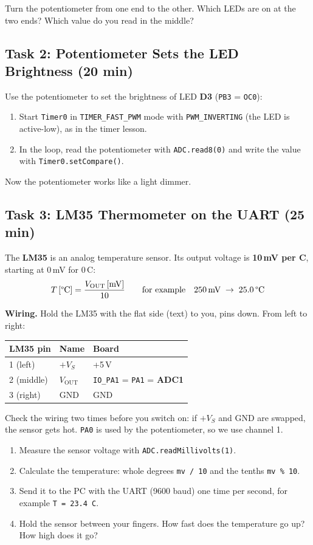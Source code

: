 \documentclass[11pt,a4paper]{article}
\newcommand{\code}[1]{\texttt{#1}}
\begin{document}
Turn the potentiometer from one end to the other. Which LEDs are on at the
two ends? Which value do you read in the middle?

\subsection*{Task 2: Potentiometer Sets the LED Brightness (20 min)}
Use the potentiometer to set the brightness of LED \textbf{D3}
(\code{PB3} = \code{OC0}):
\begin{enumerate}
  \item Start \code{Timer0} in \code{TIMER\_FAST\_PWM} mode with
        \code{PWM\_INVERTING} (the LED is active-low), as in the timer lesson.
  \item In the loop, read the potentiometer with \code{ADC.read8(0)} and write
        the value with \code{Timer0.setCompare()}.
\end{enumerate}
Now the potentiometer works like a light dimmer.

\subsection*{Task 3: LM35 Thermometer on the UART (25 min)}
The \textbf{LM35} is an analog temperature sensor. Its output voltage is
\textbf{10\,mV per \textdegree C}, starting at 0\,mV for 0\,\textdegree C:
\[ T\,[\text{\textdegree C}] = \frac{V_{\text{OUT}}\,[\text{mV}]}{10}
   \qquad\text{for example}\quad 250\,\text{mV} \;\rightarrow\; 25.0\,\text{\textdegree C} \]

\textbf{Wiring.} Hold the LM35 with the flat side (text) to you, pins down.
From left to right:
\begin{center}
\begin{tabular}{lll}
\toprule
\textbf{LM35 pin} & \textbf{Name} & \textbf{Board} \\
\midrule
1 (left)   & $+V_S$         & +5\,V \\
2 (middle) & $V_{\text{OUT}}$ & \code{IO\_PA1} = \code{PA1} = \textbf{ADC1} \\
3 (right)  & GND            & GND \\
\bottomrule
\end{tabular}
\end{center}
Check the wiring two times before you switch on: if $+V_S$ and GND are
swapped, the sensor gets hot. \code{PA0} is used by the potentiometer, so we
use channel 1.

\begin{enumerate}
  \item Measure the sensor voltage with \code{ADC.readMillivolts(1)}.
  \item Calculate the temperature: whole degrees \code{mv / 10} and the
        tenths \code{mv \% 10}.
  \item Send it to the PC with the UART (9600 baud) one time per second, for
        example \code{T = 23.4 C}.
  \item Hold the sensor between your fingers. How fast does the temperature
        go up? How high does it go?
\end{enumerate}
\end{document}
